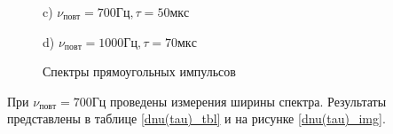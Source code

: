 \documentclass[a4paper,12pt]{article} %
\begin{document}
\begin{figure}[h!]
\begin{minipage}[h!]{0.47\linewidth}
 c) $\nu_{повт} = 700 Гц, \tau = 50 мкс$ \\
\end{minipage}
\hfill
\begin{minipage}[h!]{0.47\linewidth}
 d) $\nu_{повт} = 1000 Гц, \tau = 70 мкс$ \\
\end{minipage}
\caption{Спектры прямоугольных импульсов}
\label{прямоуг}
\end{figure}
При $\nu_{повт} = 700 Гц$ проведены измерения ширины спектра. Результаты 
представлены в таблице \ref{dnu(tau)_tbl} и на рисунке \ref{dnu(tau)_img}.
\end{document}
